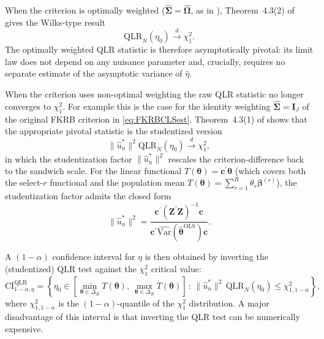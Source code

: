 When the criterion is optimally weighted ($\hat{\bm{\Sigma}} = \hat{\bm{\Omega}}$, as in ), Theorem~4.3(2) of \citet{ChenPouzo2015} gives the Wilks-type result
\begin{equation}
\label{eq:QLRoptimal}
    \mathrm{QLR}_N(\eta_0) \overset{d}{\longrightarrow} \chi^2_1.
\end{equation}
The optimally weighted QLR statistic is therefore asymptotically pivotal: its limit law does not depend on any nuisance parameter and, crucially, requires no separate estimate of the asymptotic variance of $\hat{\eta}$.

When the criterion uses non-optimal weighting the raw QLR statistic no longer converges to $\chi^2_1$.
For example this is the case for the identity weighting $\hat{\bm{\Sigma}} = \bm{I}_J$ of the original FKRB criterion in \cref{eq:FKRBCLSest}.
Theorem~4.3(1) of \citet{ChenPouzo2015} shows that the appropriate pivotal statistic is the studentized version
\begin{equation}
\label{eq:QLRnonoptimal}
    \|\hat{u}^*_n\|^2 \mathrm{QLR}_N(\eta_0) \overset{d}{\longrightarrow} \chi^2_1,
\end{equation}
in which the studentization factor $\|\hat{u}^*_n\|^2$ rescales the criterion-difference back to the sandwich scale.
For the linear functional $T(\bm{\theta}) = \bm{c}^\prime\bm{\theta}$ (which covers both the select-$r$ functional and the population mean $T(\bm{\theta}) = \sum_{r=1}^R \theta_r \bm{\beta}^{(r)}$), the studentization factor admits the closed form
\begin{equation}
\label{eq:QLRstudentisation}
    \|\hat{u}^*_n\|^2 = \frac{\bm{c}^\prime (\bm{Z}^\prime\bm{Z})^{-1}\bm{c}}{\bm{c}^\prime\widehat{\mathrm{Var}}(\hat{\bm{\theta}}^{\mathrm{OLS}})\bm{c}}.
\end{equation}

A $(1-\alpha)$ confidence interval for $\eta$ is then obtained by inverting the (studentized) QLR test against the $\chi^2_1$ critical value:
\begin{equation}
\label{eq:CIQLR}
    \mathrm{CI}^{\mathrm{QLR}}_{1-\alpha, \eta} = \left\{\eta_0 \in \left[\min_{\bm{\theta}\in\Delta_R} T(\bm{\theta}),\ \max_{\bm{\theta}\in\Delta_R} T(\bm{\theta})\right] \,:\, \|\hat{u}^*_n\|^2\,\mathrm{QLR}_N(\eta_0) \leq \chi^2_{1, 1-\alpha}\right\},
\end{equation}
where $\chi^2_{1, 1-\alpha}$ is the $(1-\alpha)$-quantile of the $\chi^2_1$ distribution.
A major disadvantage of this interval is that inverting the QLR test can be numerically expensive.

